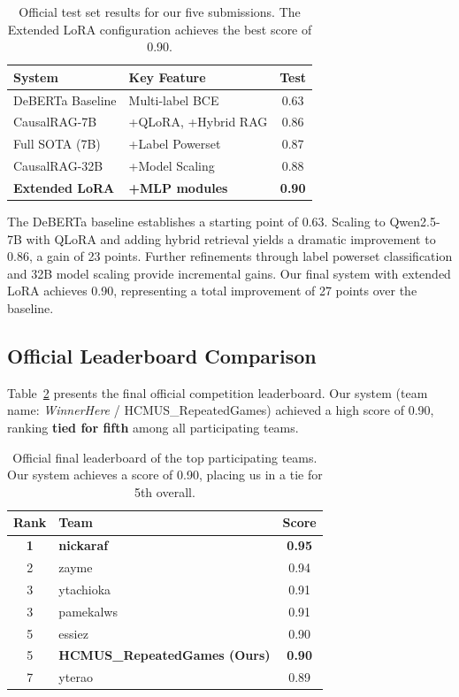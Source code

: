 \documentclass[11pt]{article}
\begin{document}
\begin{table}[t]
\centering
\small
\begin{tabular}{llc}
\toprule
\textbf{System} & \textbf{Key Feature} & \textbf{Test} \\
\midrule
DeBERTa Baseline & Multi-label BCE & 0.63 \\
CausalRAG-7B & +QLoRA, +Hybrid RAG & 0.86 \\
Full SOTA (7B) & +Label Powerset & 0.87 \\
CausalRAG-32B & +Model Scaling & 0.88 \\
\textbf{Extended LoRA} & \textbf{+MLP modules} & \textbf{0.90} \\
\bottomrule
\end{tabular}
\caption{Official test set results for our five submissions. The Extended LoRA configuration achieves the best score of 0.90.}
\label{tab:results}
\end{table}

The DeBERTa baseline establishes a starting point of 0.63. Scaling to Qwen2.5-7B with QLoRA and adding hybrid retrieval yields a dramatic improvement to 0.86, a gain of 23 points. Further refinements through label powerset classification and 32B model scaling provide incremental gains. Our final system with extended LoRA achieves 0.90, representing a total improvement of 27 points over the baseline.

\subsection{Official Leaderboard Comparison}

Table~\ref{tab:leaderboard} presents the final official competition leaderboard. Our system (team name: \textit{WinnerHere} / HCMUS\_RepeatedGames) achieved a high score of 0.90, ranking \textbf{tied for fifth} among all participating teams.

\begin{table}[t]
\centering
\small
\begin{tabular}{clc}
\toprule
\textbf{Rank} & \textbf{Team} & \textbf{Score} \\
\midrule
\textbf{1} & \textbf{nickaraf} & \textbf{0.95} \\
2 & zayme & 0.94 \\
3 & ytachioka & 0.91 \\
3 & pamekalws & 0.91 \\
5 & essiez & 0.90 \\
5 & \textbf{HCMUS\_RepeatedGames (Ours)} & \textbf{0.90} \\
7 & yterao & 0.89 \\
\bottomrule
\end{tabular}
\caption{Official final leaderboard of the top participating teams. Our system achieves a score of 0.90, placing us in a tie for 5th overall.}
\label{tab:leaderboard}
\end{table}
\end{document}
